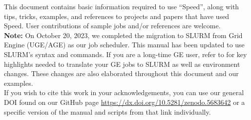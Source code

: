 
This document contains basic information required to use ``Speed'', 
along with tips, tricks, examples, and references to projects and papers 
that have used Speed.
User contributions of sample jobs and/or references are welcome. \\

\noindent \textbf{Note:} On October 20, 2023, we completed the migration to SLURM 
from Grid Engine (UGE/AGE) as our job scheduler. 
This manual has been updated to use SLURM’s syntax and commands. 
If you are a long-time GE user, refer to  for key highlights needed to 
translate your GE jobs to SLURM as well as environment changes. 
These changes are also elaborated throughout this document and our examples.\\

If you wish to cite this work in your acknowledgements, you can use our general DOI found on our GitHub page
\url{https://dx.doi.org/10.5281/zenodo.5683642} or a specific version of the manual and scripts from that link individually.